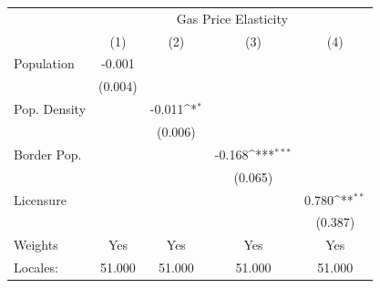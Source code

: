 {
\def\sym#1{\ifmmode^{#1}\else\(^{#1}\)\fi}
\begin{tabular}{l*{4}{c}}
\hline\hline
            &\multicolumn{4}{c}{Gas Price Elasticity}                                               \\
            &\multicolumn{1}{c}{(1)}         &\multicolumn{1}{c}{(2)}         &\multicolumn{1}{c}{(3)}         &\multicolumn{1}{c}{(4)}         \\
\hline
Population  &      -0.001         &                     &                     &                     \\
            &     (0.004)         &                     &                     &                     \\
[1em]
Pop. Density&                     &      -0.011\sym{*}&                     &                     \\
            &                     &     (0.006)         &                     &                     \\
[1em]
Border Pop. &                     &                     &      -0.168\sym{***} &                     \\
            &                     &                     &     (0.065)         &                     \\
[1em]
Licensure   &                     &                     &                     &       0.780\sym{**}  \\
            &                     &                     &                     &     (0.387)         \\
\hline
Weights     &         Yes         &         Yes         &         Yes         &         Yes         \\
Locales:    &      51.000         &      51.000         &      51.000         &      51.000         \\
\hline\hline
\end{tabular}
}
